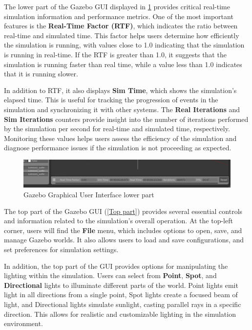 \documentclass[../../main]{subfiles}
\begin{document}
The lower part of the Gazebo GUI displayed in \cref{Lower part} provides critical real-time simulation information 
and performance metrics. One of the most important features is the \textbf{Real-Time 
Factor (RTF)}, which indicates the ratio between real-time and simulated time. This 
factor helps users determine how efficiently the simulation is running, with values 
close to 1.0 indicating that the simulation is running in real-time. If the RTF is 
greater than 1.0, it suggests that the simulation is running faster than real time, 
while a value less than 1.0 indicates that it is running slower.

In addition to RTF, it also displays \textbf{Sim Time}, which 
shows the simulation's elapsed time. This is useful for tracking the progression of 
events in the simulation and synchronizing it with other systems. The \textbf{Real Iterations} 
and \textbf{Sim Iterations} counters provide insight into the number of iterations performed 
by the simulation per second for real-time and simulated time, respectively. Monitoring 
these values helps users assess the efficiency of the simulation and diagnose performance 
issues if the simulation is not proceeding as expected.

\begin{figure}[H]
    \centering
\includegraphics[width=\textwidth]{fig/gui_lower_part.png}
\caption{Gazebo Graphical User Interface lower part}
\label{Lower part} %
\end{figure}

The top part of the Gazebo GUI (\cref{Top part}) provides several essential controls and information 
related to the simulation’s overall operation. At the top-left corner, users will find the 
\textbf{File} menu, which includes options to open, save, and manage Gazebo worlds. 
It also allows users to load and save configurations, and set preferences for simulation 
settings. 

In addition, the top part of the GUI provides options for manipulating the lighting 
within the simulation. Users can select from \textbf{Point}, \textbf{Spot}, and 
\textbf{Directional} lights to illuminate different parts of the world. Point lights 
emit light in all directions from a single point, Spot lights create a focused beam 
of light, and Directional lights simulate sunlight, casting parallel rays in a 
specific direction. This allows for realistic and customizable lighting in the 
simulation environment. 
\end{document}

